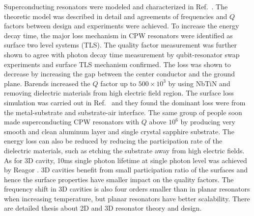 Superconducting resonators were modeled and characterized in Ref.~. The theoretic model was described in detail and agreements of frequencies and $Q$ factors between design and experiments were achieved. To increase the energy decay time, the major loss mechanism in CPW resonators were identified as surface two level systems (TLS)\cite{Gao2008Exp}. The quality factor measurement was further shown to agree with photon decay time  measurement by qubit-resonator swap experiments and surface TLS mechanism confirmed\cite{Wang2009}. The loss was shown to decrease by increasing the gap between the center conductor and the ground plane. Barends \etal{} increased the $Q$ factor up to $500\times 10^3$ by using NbTiN and removing dielectric materials from high electric field region\cite{Barends2010APL}. The surface loss simulation was carried out in Ref.~ and they found the dominant loss were from the metal-substrate and substrate-air interface. The same group of people soon made superconducting CPW resonators with $Q$ above $10^6$ by producing very smooth and clean aluminum layer and single crystal sapphire substrate\cite{Megrant2012}. The energy loss can also be reduced by reducing the participation rate of the dielectric materials, such as etching the substrate away from high electric fields\cite{Bruno2015}. As for 3D cavity, 10ms single photon lifetime at single photon level was achieved by Reagor \etal{}\cite{Reagor2013}. 3D cavities benefit from small participation ratio of the surfaces and hence the surface properties have smaller impact on the quality factors. The frequency shift in 3D cavities is also four orders smaller than in planar resonators when increasing temperature, but planar resonators have better scalability. There are detailed thesis about 2D\cite{Geerlings2013} and 3D\cite{Reagor2015thesis} resonator theory and design.


